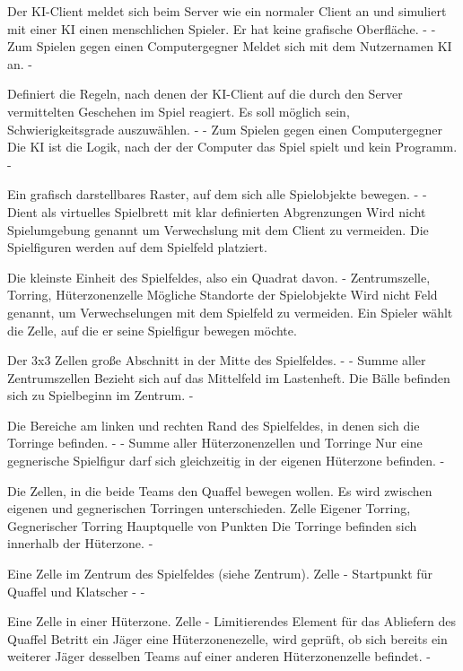 {Der KI-Client meldet sich beim Server wie ein normaler Client an und simuliert mit einer KI einen menschlichen Spieler. Er hat keine grafische Oberfläche. }
{-}
{-}
{Zum Spielen gegen einen Computergegner}
{Meldet sich mit dem Nutzernamen \glqq{}KI\grqq{} an.}
{-}

{Definiert die Regeln, nach denen der KI-Client auf die durch den Server vermittelten Geschehen im Spiel reagiert. Es soll möglich sein, Schwierigkeitsgrade auszuwählen.}
{-}
{-}
{Zum Spielen gegen einen Computergegner}
{Die KI ist die Logik, nach der der Computer das Spiel spielt und kein Programm.}
{-}

{Ein grafisch darstellbares Raster, auf dem sich alle Spielobjekte bewegen.}
{-}
{-}
{Dient als virtuelles Spielbrett mit klar definierten Abgrenzungen}
{Wird nicht Spielumgebung genannt um Verwechslung mit dem Client zu vermeiden.}
{Die Spielfiguren werden auf dem Spielfeld platziert.}

{Die kleinste Einheit des Spielfeldes, also ein Quadrat davon.}
{-}
{Zentrumszelle, Torring, Hüterzonenzelle}
{Mögliche Standorte der Spielobjekte}
{Wird nicht Feld genannt, um Verwechselungen mit dem Spielfeld zu vermeiden.}
{Ein Spieler wählt die Zelle, auf die er seine Spielfigur bewegen möchte.}

{Der 3x3 Zellen große Abschnitt in der Mitte des Spielfeldes.}
{-}
{-}
{Summe aller Zentrumszellen}
{Bezieht sich auf das Mittelfeld im Lastenheft. Die Bälle befinden sich zu Spielbeginn im Zentrum.}
{-}

{Die Bereiche am linken und rechten Rand des Spielfeldes, in denen sich die Torringe befinden.}
{-}
{-}
{Summe aller Hüterzonenzellen und Torringe}
{Nur eine gegnerische Spielfigur darf sich gleichzeitig in der eigenen Hüterzone befinden.}
{-}

{Die Zellen, in die beide Teams den Quaffel bewegen wollen. Es wird zwischen eigenen und gegnerischen Torringen unterschieden.}
{Zelle}
{Eigener Torring, Gegnerischer Torring}
{Hauptquelle von Punkten}
{Die Torringe befinden sich innerhalb der Hüterzone.}
{-}

{Eine Zelle im Zentrum des Spielfeldes (siehe Zentrum).}
{Zelle}
{-}
{Startpunkt für Quaffel und Klatscher}
{-}
{-}

{Eine Zelle in einer Hüterzone.}
{Zelle}
{-}
{Limitierendes Element für das Abliefern des Quaffel}
{Betritt ein Jäger eine Hüterzonenezelle, wird geprüft, ob sich bereits ein weiterer Jäger desselben Teams auf einer anderen Hüterzonenzelle befindet.}
{-}

